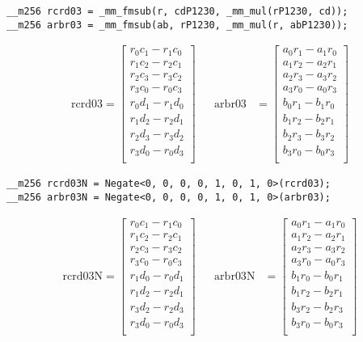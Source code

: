 \begin{verbatim}
__m256 rcrd03 = _mm_fmsub(r, cdP1230, _mm_mul(rP1230, cd));
__m256 arbr03 = _mm_fmsub(ab, rP1230, _mm_mul(r, abP1230));
\end{verbatim} 

\begin{align*}
\mathrm{rcrd03} 
=
\begin{bmatrix}
r_0c_1 - r_1c_0\\
r_1c_2 - r_2c_1\\
r_2c_3 - r_3c_2\\
r_3c_0 - r_0c_3\\
r_0d_1 - r_1d_0\\
r_1d_2 - r_2d_1\\
r_2d_3 - r_3d_2\\
r_3d_0 - r_0d_3\\
\end{bmatrix}
&&
\mathrm{arbr03} 
&=
\begin{bmatrix}
a_0r_1 - a_1r_0\\
a_1r_2 - a_2r_1\\
a_2r_3 - a_3r_2\\
a_3r_0 - a_0r_3\\
b_0r_1 - b_1r_0\\
b_1r_2 - b_2r_1\\
b_2r_3 - b_3r_2\\
b_3r_0 - b_0r_3\\
\end{bmatrix}
\end{align*}

\begin{verbatim}
__m256 rcrd03N = Negate<0, 0, 0, 0, 1, 0, 1, 0>(rcrd03);
__m256 arbr03N = Negate<0, 0, 0, 0, 1, 0, 1, 0>(arbr03);
\end{verbatim} 

\begin{align*}
\mathrm{rcrd03N} 
=
\begin{bmatrix}
r_0c_1 - r_1c_0\\
r_1c_2 - r_2c_1\\
r_2c_3 - r_3c_2\\
r_3c_0 - r_0c_3\\
r_1d_0 - r_0d_1\\
r_1d_2 - r_2d_1\\
r_3d_2 - r_2d_3\\
r_3d_0 - r_0d_3\\
\end{bmatrix}
&&
\mathrm{arbr03N} 
&=
\begin{bmatrix}
a_0r_1 - a_1r_0\\
a_1r_2 - a_2r_1\\
a_2r_3 - a_3r_2\\
a_3r_0 - a_0r_3\\
b_1r_0 - b_0r_1\\
b_1r_2 - b_2r_1\\
b_3r_2 - b_2r_3\\
b_3r_0 - b_0r_3\\
\end{bmatrix}
\end{align*}

